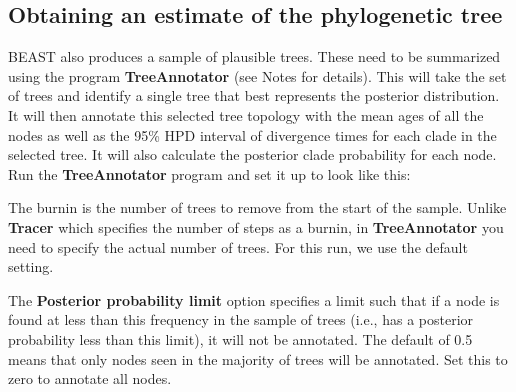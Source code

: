\documentclass[12pt]{article}
\begin{document}
\medskip{}

\subsection*{Obtaining an estimate of the phylogenetic tree}

BEAST also produces a sample of plausible trees. 
These need to be summarized using the program {\bf TreeAnnotator} (see Notes for details). This will take the set of trees and identify a single tree that best represents the posterior distribution. It will then annotate this selected tree topology with the mean ages of all the
nodes as well as the 95\% HPD interval of divergence times for each clade in the selected tree. It will also calculate the posterior clade probability for each
node. Run the {\bf TreeAnnotator} program and set it up to look like this:

\medskip{}


\medskip{}

The burnin is the number of trees to remove from the start of the sample. Unlike {\bf Tracer} which specifies the number of
steps as a burnin, in {\bf TreeAnnotator} you need to specify the actual number of trees. For this run, we use the default setting.

The {\bf Posterior probability limit} option specifies a limit such that if a node is found at less than this frequency in the sample
of trees (i.e., has a posterior probability less than this limit), it will not be annotated. The default of 0.5 means that only nodes
seen in the majority of trees will be annotated. Set this to zero to annotate all nodes.
\end{document}
